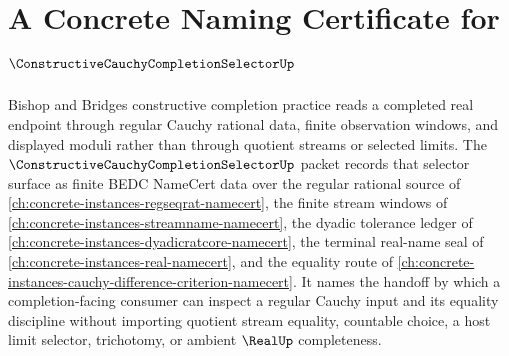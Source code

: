 \chapter{A Concrete Naming Certificate for $\ConstructiveCauchyCompletionSelectorUp$}
\label{ch:concrete-instances-constructive-cauchy-completion-selector-namecert}

Bishop and Bridges constructive completion practice reads a completed real endpoint through regular Cauchy rational data, finite observation windows, and displayed moduli rather than through quotient streams or selected limits. The $\ConstructiveCauchyCompletionSelectorUp$ packet records that selector surface as finite BEDC NameCert data over the regular rational source of \autoref{ch:concrete-instances-regseqrat-namecert}, the finite stream windows of \autoref{ch:concrete-instances-streamname-namecert}, the dyadic tolerance ledger of \autoref{ch:concrete-instances-dyadicratcore-namecert}, the terminal real-name seal of \autoref{ch:concrete-instances-real-namecert}, and the equality route of \autoref{ch:concrete-instances-cauchy-difference-criterion-namecert}. It names the handoff by which a completion-facing consumer can inspect a regular Cauchy input and its equality discipline without importing quotient stream equality, countable choice, a host limit selector, trichotomy, or ambient $\RealUp$ completeness.

